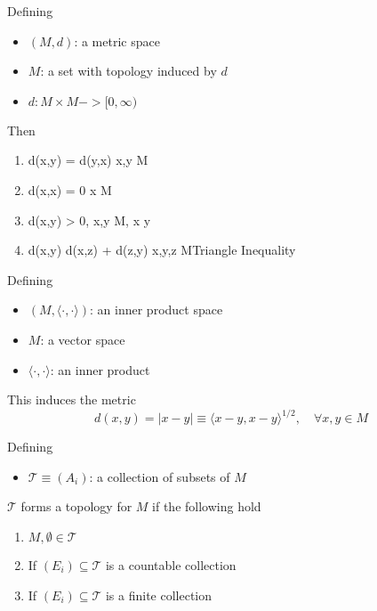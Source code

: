 \begin{definition}

    Defining
    \begin{itemize}
        \item $(M,d)$: a metric space
        \item $M$: a set with topology induced by $d$
        \item $d: M \times M -> [0, \infty)$
    \end{itemize}
    Then
    \begin{enumerate}
        \item d(x,y) = d(y,x) \forall x,y \in M \hfill{}
        \item d(x,x) = 0 \forall x \in M
        \item d(x,y) > 0, \forall x,y \in M, x \neq y \hfill{}
        \item d(x,y) \leq d(x,z) + d(z,y) \forall x,y,z \in M\hfill{Triangle Inequality}
    \end{enumerate}

\end{definition}

\begin{definition}

    Defining
    \begin{itemize}
        \item $(M, \langle \cdot, \cdot \rangle)$: an inner product space
        \item $M$: a vector space
        \item $\langle \cdot, \cdot \rangle$: an inner product
    \end{itemize}
    This induces the metric
    \begin{equation}
        d(x,y) = |x-y| \equiv \langle x-y, x-y \rangle^{1/2}, \quad\forall x,y \in M
    \end{equation}

\end{definition}

\begin{definition}[Topology]

    Defining
    \begin{itemize}
        \item $\mathcal{T} \equiv (A_i)$: a collection of subsets of $M$
    \end{itemize}
    $\mathcal{T}$ forms a topology for $M$ if the following hold
    \begin{enumerate}
        \item $M, \emptyset \in \mathcal{T}$
        \item If $(E_i) \subseteq \mathcal{T}$ is a countable collection
        \item If $(E_i) \subseteq \mathcal{T}$ is a finite collection
    \end{enumerate}
    
\end{definition}

